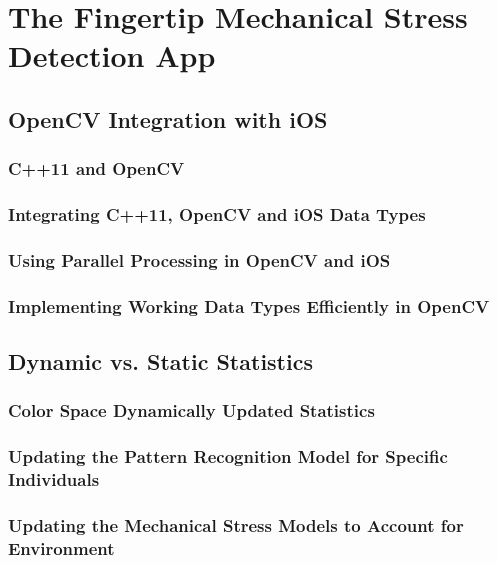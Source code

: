 \documentclass[10pt,a4paper]{article}
\begin{document}
\section{The Fingertip Mechanical Stress Detection App}\label{sec:FingertipMechanicalStressDetectionApp}
\subsection{OpenCV Integration with iOS}\label{sec:OpenCVIntegrationWithIOS}
\subsubsection{C++11 and OpenCV}\label{sec:C++11AndOpenCV}
\subsubsection{Integrating C++11, OpenCV and iOS Data Types}\label{sec:IntegratingC++11AndIOSDataTypes}
\subsubsection{Using Parallel Processing in OpenCV and iOS}\label{sec:ParallelProcessingInOpenCVAndIOS}
\subsubsection{Implementing Working Data Types Efficiently in OpenCV}\label{sec:ImplementingDataTypesEfficientlyOpenCV}
\subsection{Dynamic vs. Static Statistics}\label{sec:DynamicVsStaticStatistics}
\subsubsection{Color Space Dynamically Updated Statistics}\label{sec:ColorSpaceDynamicallyUpdatedStatistics}
\subsubsection{Updating the Pattern Recognition Model for Specific Individuals}\label{sec:UpdatingPatternRecognitionModelForSpecificIndividuals}
\subsubsection{Updating the Mechanical Stress Models to Account for Environment}\label{sec:UpdatingMechanicalStressModelsToAccountForEnvironment}
\end{document}
